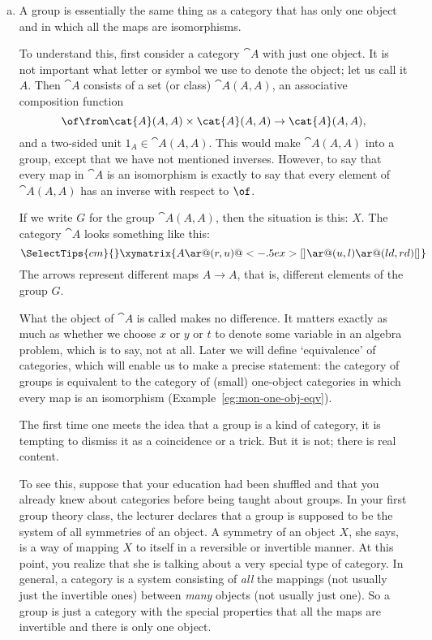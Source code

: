 \begin{examples}
\begin{enumerate}[(b)]
\item   
\label{eg:cats-as:groups}
A group is essentially the same thing as a category that has only one%
%
%
%
object and in which all the maps are isomorphisms.

To understand this, first consider a category $\cat{A}$ with just one
object.  It is not important what letter or symbol we use to denote the
object; let us call it $A$.  Then $\cat{A}$ consists of a set (or class)
$\cat{A}(A, A)$, an associative composition function
\[
\of\from  \cat{A}(A, A) \times \cat{A}(A, A) \to \cat{A}(A, A),
\]
and a two-sided unit $1_A \in \cat{A}(A, A)$.  This would make $\cat{A}(A,
A)$ into a group, except that we have not mentioned inverses.  However, to
say that every map in $\cat{A}$ is an isomorphism is exactly to say that
every element of $\cat{A}(A, A)$ has an inverse with respect to $\of$.

If we write $G$ for the group $\cat{A}(A, A)$, then the situation is this:
% 
$X$.
% 
The category $\cat{A}$ looks something like this:
\[
\SelectTips{cm}{}
\xymatrix{A \ar@(r,u)@<-.5ex>[]_{} \ar@(u,l) \ar@(ld,rd)[]_{}}
\]
The arrows represent different maps $A \to A$, that is, different elements of
the group $G$. 

What the object of $\cat{A}$ is called makes no difference.  It matters
exactly as much as whether we choose $x$ or $y$ or $t$ to denote some
variable in an algebra problem, which is to say, not at all.  Later we will
define `equivalence' of categories, which will enable us to make a precise
statement: the category of groups is equivalent to the category of (small)
one-object categories in which every map is an isomorphism
(Example~\ref{eg:mon-one-obj-eqv}).

The first time one meets the idea that a group is a kind of category, it is
tempting to dismiss it as a coincidence or a trick.  But it is not; there
is real content.

To see this, suppose that your education had been shuffled and that you
already knew about categories before being taught about groups.  In your
first group theory class, the lecturer declares that a group is supposed to
be the system of all symmetries of an object.  A symmetry of an object $X$,
she says, is a way of mapping $X$ to itself in a reversible or invertible
manner.  At this point, you realize that she is talking about a very
special type of category.  In general, a category is a system consisting of
\emph{all} the mappings (not usually just the invertible ones) between
\emph{many} objects (not usually just one).  So a group is just a category
with the special properties that all the maps are invertible and there is
only one object.


\end{enumerate}
\end{examples}

